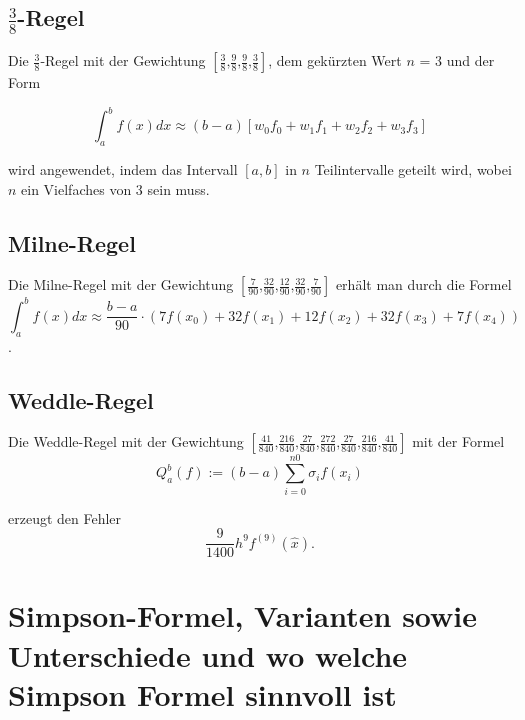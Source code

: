 \subsection{\(\frac{3}{8}\)-Regel}
\label{sec:3/8}
Die \(\frac{3}{8}\)-Regel mit der Gewichtung \( [\frac{3}{8} \text{,}\frac{9}{8} \text{,}\frac{9}{8} \text{,}\frac{3}{8}]\), dem gekürzten Wert $n$ = 3 \textsc{\cite[S. 342] {Gewichte}} und der Form

\[ \int_a^b f(x) dx \approx (b-a) [w_0f_0 + w_1f_1 + w_2f_2 + w_3f_3]\]

wird angewendet, indem das Intervall $[a, b]$ in $n$ Teilintervalle geteilt wird, wobei $n$ ein Vielfaches von 3 sein muss.

\subsection{Milne-Regel}
\label{sec:Milne}
Die Milne-Regel mit der Gewichtung \( [\frac{7}{90} \text{,} \frac{32}{90} \text{,} \frac{12}{90} \text{,} \frac{32}{90} \text{,} \frac{7}{90}] \) \textsc{\cite[S. 342] {Gewichte}}
erhält man durch die Formel
\[ \int_a^b f(x) dx \approx \frac{b - a}{90} \cdot (7f(x_0) + 32f(x_1) + 12f(x_2) + 32f(x_3) + 7f(x_4))\]
\textsc{\cite[S. 19] {Simpsonregel/Milneregel}}.

\subsection{Weddle-Regel}
\label{sec:Weddle}
Die Weddle-Regel mit der Gewichtung \( [\frac{41}{840} \text{,} \frac{216}{840} \text{,} \frac{27}{840} \text{,} \frac{272}{840} \text{,} \frac{27}{840} \text{,} \frac{216}{840} \text{,} \frac{41}{840}] \) \textsc{\cite[S. 342] {Gewichte}} mit der Formel
\[ Q_a^b (f) := (b - a) \sum_{i=0}^{n0} \sigma_i f(x_i)\] 

\textsc{\cite[S. 5] {Weddleregel}} erzeugt den Fehler \[ \frac{9}{1400}h^9f^{(9)} (\hat{x}) \text{.} \]



\section{Simpson-Formel, Varianten sowie Unterschiede und wo welche Simpson Formel sinnvoll ist}

